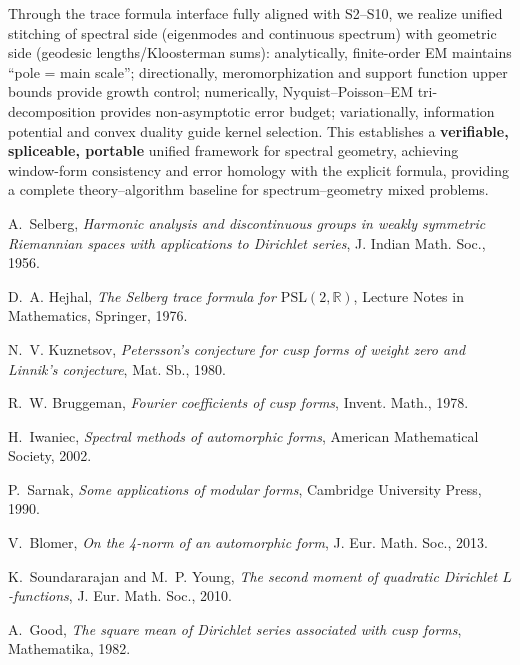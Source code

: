 \documentclass[11pt,a4paper]{article}
\theoremstyle{remark}
\begin{document}
Through the trace formula interface fully aligned with S2--S10, we realize unified stitching of spectral side (eigenmodes and continuous spectrum) with geometric side (geodesic lengths/Kloosterman sums): analytically, finite-order EM maintains ``pole = main scale''; directionally, meromorphization and support function upper bounds provide growth control; numerically, Nyquist--Poisson--EM tri-decomposition provides non-asymptotic error budget; variationally, information potential and convex duality guide kernel selection. This establishes a \textbf{verifiable, spliceable, portable} unified framework for spectral geometry, achieving window-form consistency and error homology with the explicit formula, providing a complete theory--algorithm baseline for spectrum--geometry mixed problems.

\begin{thebibliography}{9}

A.~Selberg, \emph{Harmonic analysis and discontinuous groups in weakly symmetric Riemannian spaces with applications to Dirichlet series}, J. Indian Math. Soc., 1956.

D.~A. Hejhal, \emph{The Selberg trace formula for $\mathrm{PSL}(2,\mathbb{R})$}, Lecture Notes in Mathematics, Springer, 1976.

N.~V. Kuznetsov, \emph{Petersson's conjecture for cusp forms of weight zero and Linnik's conjecture}, Mat. Sb., 1980.

R.~W. Bruggeman, \emph{Fourier coefficients of cusp forms}, Invent. Math., 1978.

H.~Iwaniec, \emph{Spectral methods of automorphic forms}, American Mathematical Society, 2002.

P.~Sarnak, \emph{Some applications of modular forms}, Cambridge University Press, 1990.

V.~Blomer, \emph{On the 4-norm of an automorphic form}, J. Eur. Math. Soc., 2013.

K.~Soundararajan and M.~P. Young, \emph{The second moment of quadratic Dirichlet $L$-functions}, J. Eur. Math. Soc., 2010.

A.~Good, \emph{The square mean of Dirichlet series associated with cusp forms}, Mathematika, 1982.

\end{thebibliography}
\end{document}
